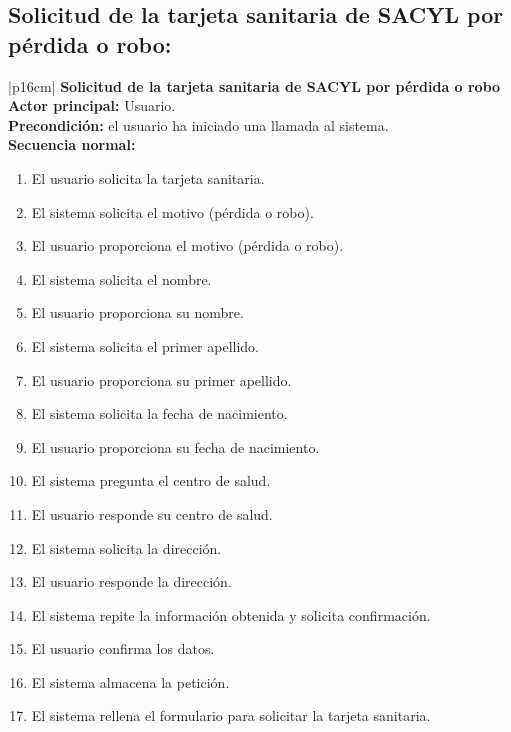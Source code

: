    \subsection{Solicitud de la tarjeta sanitaria de SACYL por pérdida o robo:}
        \begin{longtable}{|p{16cm}|} 
        \hline
        \textbf{Solicitud de la tarjeta sanitaria de SACYL por pérdida o robo} \\ \hline
        \textbf{Actor principal:} Usuario. \\ \hline
        \textbf{Precondición:} el usuario ha iniciado una llamada al sistema. \\ \hline
        \textbf{Secuencia normal:} \\
        \begin{minipage}[t]{\linewidth}
            \begin{enumerate}
                \item El usuario solicita la tarjeta sanitaria.
                \item El sistema solicita el motivo (pérdida o robo).
                \item El usuario proporciona el motivo (pérdida o robo).
                \item El sistema solicita el nombre.
                \item El usuario proporciona su nombre.
                \item El sistema solicita el primer apellido.
                \item El usuario proporciona su primer apellido.
                \item El sistema solicita la fecha de nacimiento.
                \item El usuario proporciona su fecha de nacimiento.
                \item El sistema pregunta el centro de salud.
                \item El usuario responde su centro de salud.
                \item El sistema solicita la dirección.
                \item El usuario responde la dirección.
                \item El sistema repite la información obtenida y solicita confirmación. 
                \item El usuario confirma los datos.
                \item El sistema almacena la petición.
                \item El sistema rellena el formulario para solicitar la tarjeta sanitaria.

\end{enumerate}
\end{minipage}
\end{longtable}

